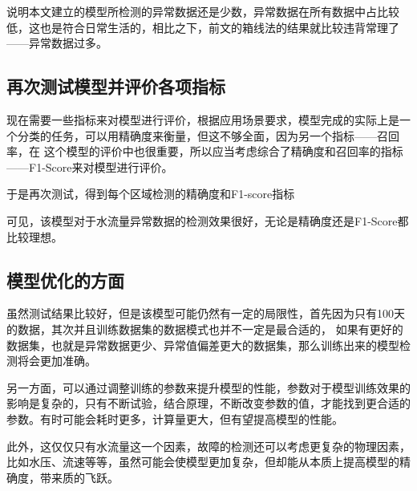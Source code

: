 \documentclass[UTF8]{article}
\begin{document}
			说明本文建立的模型所检测的异常数据还是少数，异常数据在所有数据中占比较低，这也是符合日常生活的，相比之下，前文的箱线法的结果就比较违背常理了——异常数据过多。
			\subsection{再次测试模型并评价各项指标}
				\par 现在需要一些指标来对模型进行评价，根据应用场景要求，模型完成的实际上是一个分类的任务，可以用精确度来衡量，但这不够全面，因为另一个指标——召回率，在
				这个模型的评价中也很重要，所以应当考虑综合了精确度和召回率的指标——F1-Score来对模型进行评价。
				\par 于是再次测试，得到每个区域检测的精确度和F1-score指标
				\begin{table}[!ht]
					\centering
				\end{table}
			可见，该模型对于水流量异常数据的检测效果很好，无论是精确度还是F1-Score都比较理想。
				\subsection{模型优化的方面}
				\par 虽然测试结果比较好，但是该模型可能仍然有一定的局限性，首先因为只有100天的数据，其次并且训练数据集的数据模式也并不一定是最合适的，
				如果有更好的数据集，也就是异常数据更少、异常值偏差更大的数据集，那么训练出来的模型检测将会更加准确。
				\par 另一方面，可以通过调整训练的参数来提升模型的性能，参数对于模型训练效果的影响是复杂的，只有不断试验，结合原理，不断改变参数的值，才能找到更合适的参数。有时可能会耗时更多，计算量更大，但有望提高模型的性能。
				\par 此外，这仅仅只有水流量这一个因素，故障的检测还可以考虑更复杂的物理因素，比如水压、流速等等，虽然可能会使模型更加复杂，但却能从本质上提高模型的精确度，带来质的飞跃。
	
	
	\newpage
\end{document}

